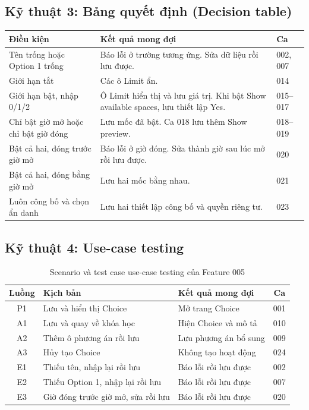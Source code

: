 \subsection{Kỹ thuật 3: Bảng quyết định (Decision table)}
\begin{longtable}{|L{5.7cm}|L{6.9cm}|L{1.7cm}|}
\hline
\textbf{Điều kiện} & \textbf{Kết quả mong đợi} & \textbf{Ca}\\ \hline
Tên trống hoặc Option 1 trống & Báo lỗi ở trường tương ứng. Sửa dữ liệu rồi lưu được. & 002, 007\\ \hline
Giới hạn tắt & Các ô Limit ẩn. & 014\\ \hline
Giới hạn bật, nhập 0/1/2 & Ô Limit hiển thị và lưu giá trị. Khi bật Show available spaces, lưu thiết lập Yes. & 015--017\\ \hline
Chỉ bật giờ mở hoặc chỉ bật giờ đóng & Lưu mốc đã bật. Ca 018 lưu thêm Show preview. & 018--019\\ \hline
Bật cả hai, đóng trước giờ mở & Báo lỗi ở giờ đóng. Sửa thành giờ sau lúc mở rồi lưu được. & 020\\ \hline
Bật cả hai, đóng bằng giờ mở & Lưu hai mốc bằng nhau. & 021\\ \hline
Luôn công bố và chọn ẩn danh & Lưu hai thiết lập công bố và quyền riêng tư. & 023\\ \hline
\end{longtable}

\subsection{Kỹ thuật 4: Use-case testing}
\begin{table}[H]
\centering\small
\begin{tabular}{|c|L{7.0cm}|L{3.8cm}|c|}
\hline
{}\textbf{Luồng} & \textbf{Kịch bản} & \textbf{Kết quả mong đợi} & \textbf{Ca} \\ \hline
P1 & Lưu và hiển thị Choice & Mở trang Choice & 001 \\ \hline
A1 & Lưu và quay về khóa học & Hiện Choice và mô tả & 010 \\ \hline
A2 & Thêm ô phương án rồi lưu & Lưu phương án bổ sung & 009 \\ \hline
A3 & Hủy tạo Choice & Không tạo hoạt động & 024 \\ \hline
E1 & Thiếu tên, nhập lại rồi lưu & Báo lỗi rồi lưu được & 002 \\ \hline
E2 & Thiếu Option 1, nhập lại rồi lưu & Báo lỗi rồi lưu được & 007 \\ \hline
E3 & Giờ đóng trước giờ mở, sửa rồi lưu & Báo lỗi rồi lưu được & 020 \\ \hline
\end{tabular}
\caption{Scenario và test case use-case testing của Feature 005}
\end{table}

